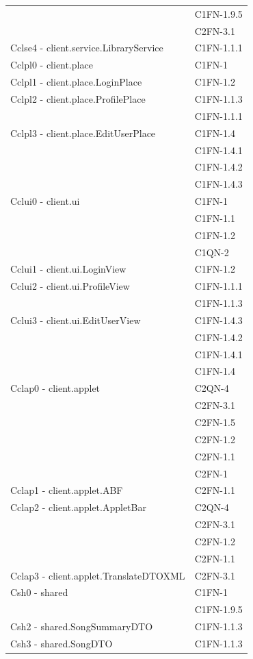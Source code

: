 \begin{footnotesize}
\begin{longtable}[!h]{|l|l|}
& C1FN-1.9.5 \\
& C2FN-3.1 \\\hline
Cclse4 - client.service.LibraryService & C1FN-1.1.1 \\\hline
Cclpl0 - client.place & C1FN-1 \\\hline
Cclpl1 - client.place.LoginPlace & C1FN-1.2 \\\hline
Cclpl2 - client.place.ProfilePlace & C1FN-1.1.3 \\
& C1FN-1.1.1 \\\hline
Cclpl3 - client.place.EditUserPlace & C1FN-1.4 \\
& C1FN-1.4.1 \\
& C1FN-1.4.2 \\
& C1FN-1.4.3 \\\hline
Cclui0 - client.ui & C1FN-1 \\
& C1FN-1.1 \\
& C1FN-1.2 \\
& C1QN-2 \\\hline
Cclui1 - client.ui.LoginView & C1FN-1.2 \\ \hline
Cclui2 - client.ui.ProfileView & C1FN-1.1.1 \\
& C1FN-1.1.3 \\\hline
Cclui3 - client.ui.EditUserView & C1FN-1.4.3 \\
& C1FN-1.4.2 \\
& C1FN-1.4.1 \\
& C1FN-1.4 \\\hline
Cclap0 - client.applet & C2QN-4 \\
& C2FN-3.1 \\
& C2FN-1.5 \\
& C2FN-1.2 \\
& C2FN-1.1 \\
& C2FN-1 \\\hline
Cclap1 - client.applet.ABF & C2FN-1.1 \\\hline
Cclap2 - client.applet.AppletBar & C2QN-4 \\
& C2FN-3.1 \\
& C2FN-1.2 \\
& C2FN-1.1 \\\hline
Cclap3 - client.applet.TranslateDTOXML & C2FN-3.1 \\\hline
Csh0 - shared & C1FN-1 \\
& C1FN-1.9.5 \\\hline
Csh2 - shared.SongSummaryDTO & C1FN-1.1.3 \\\hline
Csh3 - shared.SongDTO & C1FN-1.1.3 \\\hline

\end{longtable}
\end{footnotesize}
